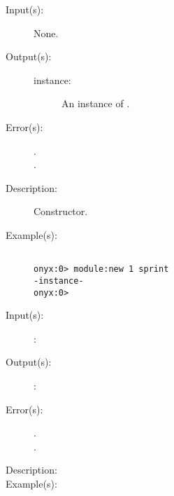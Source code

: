 \begin{description}
\label{module:new}
\item[{\onyxop{--}{new}{instance}}: ]
	\begin{description}\item[]
	\item[Input(s): ] None.
	\item[Output(s): ]
		\begin{description}\item[]
		\item[instance: ]
			An instance of .
		\end{description}
	\item[Error(s): ]
		\begin{description}\item[]
		\item[.]
		\item[.]
		\end{description}
	\item[Description: ]
		Constructor.
	\item[Example(s): ]\begin{verbatim}

onyx:0> module:new 1 sprint
-instance-
onyx:0>
		\end{verbatim}
	\end{description}
\label{module:XXX}
\item[{\onyxop{METHODINS}{XXX}{METHODOUTS}}: ]
	\begin{description}\item[]
	\item[Input(s): ]
		\begin{description}\item[]
		\item[: ]
		\end{description}
	\item[Output(s): ]
		\begin{description}\item[]
		\item[: ]
		\end{description}
	\item[Error(s): ]
		\begin{description}\item[]
		\item[.]
		\item[.]
		\end{description}
	\item[Description: ]
	\item[Example(s): ]\begin{verbatim}

		\end{verbatim}
	\end{description}
\end{description}
